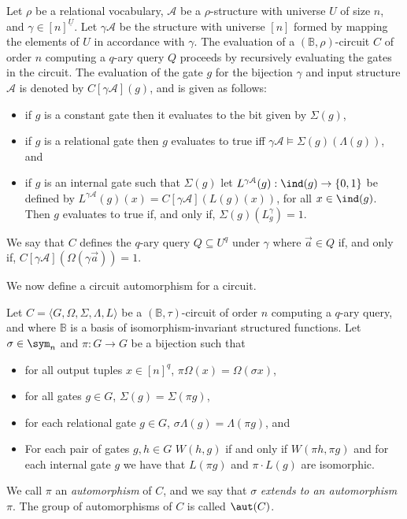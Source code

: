 \documentclass[a4paper,UKenglish]{lipics-v2018}
\begin{document}
Let $\rho$ be a relational vocabulary, $\mathcal{A}$ be a $\rho$-structure with
universe $U$ of size $n$, and $\gamma \in [n]^{\underline{U}}$. Let $\gamma
\mathcal{A}$ be the structure with universe $[n]$ formed by mapping the elements
of $U$ in accordance with $\gamma$. The evaluation of a $(\mathbb{B},
\rho)$-circuit $C$ of order $n$ computing a $q$-ary query $Q$ proceeds by
recursively evaluating the gates in the circuit. The evaluation of the gate $g$
for the bijection $\gamma$ and input structure $\mathcal{A}$ is denoted by
$C[\gamma \mathcal{A}](g)$, and is given as follows:

\begin{itemize}
\item if $g$ is a constant gate then it evaluates to the bit given by
  $\Sigma(g)$,
\item if $g$ is a relational gate then $g$ evaluates to true iff $\gamma
  \mathcal{A} \models \Sigma(g)(\Lambda (g))$, and
\item if $g$ is an internal gate such that $\Sigma (g)$ let $L^{\gamma
    \mathcal{A}}(g): \ind(g) \rightarrow \{0,1\}$ be defined by
  $L^{\gamma\mathcal{A}}(g)(x) = C[\gamma \mathcal{A}](L(g)(x))$, for all $x \in
  \ind(g)$. Then $g$ evaluates to true if, and only if, $\Sigma(g)
  (L^{\gamma}_g) = 1$.
\end{itemize}

We say that $C$ defines the $q$-ary query $Q \subseteq U^q$ under $\gamma$ where
$\vec{a} \in Q$ if, and only if, $C[\gamma \mathcal{A}](\Omega (\gamma \vec{a}))
= 1$.

We now define a circuit automorphism for a circuit.

\begin{definition}[Automorphism]\label{defn:automorphism}
  Let $C = \langle G, \Omega, \Sigma, \Lambda, L\rangle$ be a
  $(\mathbb{B},\tau)$-circuit of order $n$ computing a $q$-ary query, and where
  $\mathbb{B}$ is a basis of isomorphism-invariant structured functions. Let
  $\sigma \in \sym_n$ and $\pi: G \rightarrow G$ be a bijection such that
  \begin{itemize}
  \item for all output tuples $x \in [n]^q$, $\pi \Omega (x) = \Omega (\sigma
    x)$,
  \item for all gates $g \in G$, $\Sigma (g) = \Sigma (\pi g)$,
  \item for each relational gate $g \in G$, $\sigma \Lambda (g) = \Lambda (\pi
    g)$, and
  \item For each pair of gates $g, h \in G$ $W(h,g)$ if and only if $W(\pi h,
    \pi g)$ and for each internal gate $g$ we have that $L(\pi g)$ and $ \pi
    \cdot L(g)$ are isomorphic.
  \end{itemize}
  We call $\pi$ an \emph{automorphism} of $C$, and we say that $\sigma$
  \emph{extends to an automorphism} $\pi$. The group of automorphisms of $C$ is
  called $\aut (C)$.
\end{definition}
\end{document}
